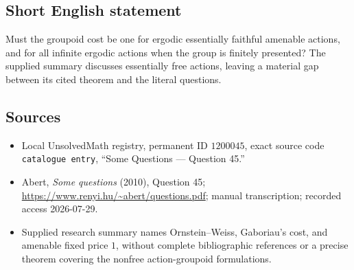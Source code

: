 \documentclass[11pt]{article}
\begin{document}
\subsection{Short English statement}
Must the groupoid cost be one for ergodic essentially faithful amenable actions, and for all infinite ergodic actions when the group is finitely presented? The supplied summary discusses essentially free actions, leaving a material gap between its cited theorem and the literal questions.
\subsection{Sources}
\begin{itemize}
\item Local UnsolvedMath registry, permanent ID \(1200045\), exact source code \texttt{catalogue entry}, ``Some Questions --- Question 45.''
\item Abert, \emph{Some questions} (2010), Question 45; \url{https://www.renyi.hu/~abert/questions.pdf}; manual transcription; recorded access 2026-07-29.
\item Supplied research summary names Ornstein--Weiss, Gaboriau's cost, and amenable fixed price \(1\), without complete bibliographic references or a precise theorem covering the nonfree action-groupoid formulations.
\end{itemize}
\end{document}
